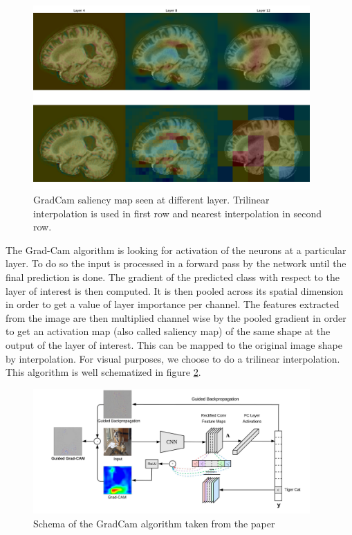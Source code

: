 \begin{figure}
    \centering
    \includegraphics[width=400]{figures/gradcam_multilayer.pdf}
    \caption{GradCam saliency map seen at different layer. Trilinear interpolation is used in first row and nearest interpolation in second row.}
    \label{fig:grad_cam_multilayer}
\end{figure}

The Grad-Cam\cite{grad_cam_2019} algorithm is looking for activation of the neurons at a particular layer. To do so the input is processed in a forward pass by the network until the final prediction is done. The gradient of the predicted class with respect to the layer of interest is then computed. It is then pooled across its spatial dimension in order to get a value of layer importance per channel. The features extracted from the image are then multiplied channel wise by the pooled gradient in order to get an activation map (also called saliency map) of the same shape at the output of the layer of interest. This can be mapped to the original image shape by interpolation. For visual purposes, we choose to do a trilinear interpolation. This algorithm is well schematized in figure \ref{fig:grad_cam_arch}.

\begin{figure}
    \centering
    \includegraphics[width=400]{figures/grad_cam_arch.jpeg}
    \caption{Schema of the GradCam algorithm taken from the paper\cite{grad_cam_2019}}
    \label{fig:grad_cam_arch}
\end{figure}

